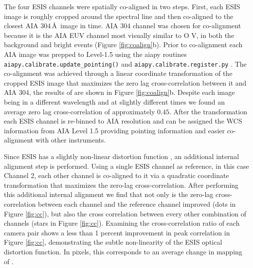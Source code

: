    		The four ESIS channels were spatially co-aligned in two steps.  
   		First, each ESIS image is roughly cropped around the \ov spectral line and then co-aligned to the closest AIA 304\,\AA\ image in time.  AIA 304 channel was chosen for co-alignment because it is the AIA EUV channel most visually similar to O V, in both the background and bright events (Figure \ref{fig:coalign}b).
   		Prior to co-alignment each AIA image was prepped to Level-1.5 using the aiapy routines \texttt{aiapy.calibrate.update\_pointing()} and \texttt{aiapy.calibrate.register.py}  \citep{aiapy}.
   		The co-alignment was achieved through a linear coordinate transformation of the cropped ESIS image that maximizes the zero lag cross-correlation between it and AIA 304, the results of are shown in Figure \ref{fig:coalign}b.
   		Despite each image being in a different wavelength and at slightly different times we found an average zero lag cross-correlation of approximately $0.45$.
   		After the transformation each ESIS channel is re-binned to AIA resolution and can be assigned the WCS  information from AIA Level 1.5 providing pointing information and easier co-alignment with other instruments.
   		
   		
   		
    	Since ESIS has a slightly non-linear distortion function \citep{ESIS}, an additional internal alignment step is performed.
    	Using a single ESIS channel as reference, in this case Channel 2, each other channel is co-aligned to it via a quadratic coordinate transformation that maximizes the zero-lag cross-correlation. 
    	After performing this additional internal alignment we find that not only is the zero-lag cross-correlation between each channel and the reference channel improved (dots in Figure \ref{fig:cc}), but also the cross correlation between every other combination of channels (stars in Figure \ref{fig:cc}).
    	Examining the cross-correlation ratio of each camera pair shows a less than 1 percent improvement in peak correlation in Figure \ref{fig:cc}, demonstrating the subtle non-linearity of the ESIS optical distortion function.
    	In pixels, this corresponds to an average change in mapping of .
    	

